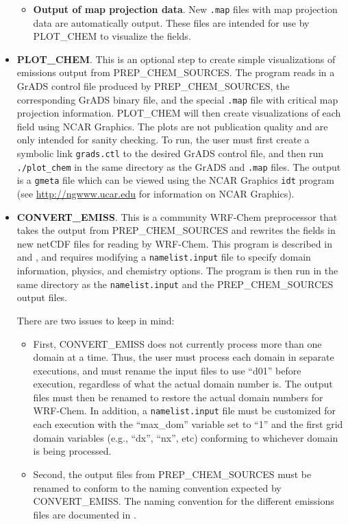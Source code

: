 \begin{itemize}
\begin{itemize}
\item \textbf{Output of map projection data}. New \texttt{.map} files with map
projection data are automatically output. These files are 
intended for use by PLOT\_CHEM to visualize the fields. 
\end{itemize}

\item \textbf{PLOT\_CHEM}. This is an optional step to create simple
visualizations of emissions output from PREP\_CHEM\_SOURCES. The program
reads in a GrADS control file produced by PREP\_CHEM\_SOURCES, the 
corresponding GrADS binary file, and the special \texttt{.map} file with 
critical map projection information. PLOT\_CHEM will then create 
visualizations of each field using NCAR Graphics. The plots are not 
publication quality and are only intended for sanity checking. To run, the 
user must first create a symbolic link \texttt{grads.ctl} to the desired 
GrADS control file, and then run \texttt{./plot\_chem} in the same directory 
as the GrADS and \texttt{.map} files. The output is a \texttt{gmeta} file 
which can be viewed using the NCAR Graphics \texttt{idt} program (see 
\url{http://ngwww.ucar.edu} for information on NCAR Graphics).

\item \textbf{CONVERT\_EMISS}. This is a community WRF-Chem preprocessor
that takes the output from PREP\_CHEM\_SOURCES and rewrites the fields in
new netCDF files for reading by WRF-Chem. This program is described in
\cite{ref:WrfChemUserGuide} and \cite{ref:WrfChemEmissionsGuide}, and requires
modifying a \texttt{namelist.input} file to specify domain information, 
physics, and chemistry options.  The program is then run in the same directory
as the \texttt{namelist.input} and the PREP\_CHEM\_SOURCES output files.

There are two issues to keep in mind:
\begin{itemize}
\item First, CONVERT\_EMISS does not currently process more than one domain at
  a time. Thus, the user must process each domain in separate executions, and 
  must rename the input files to use ``d01'' before execution, regardless of 
  what the actual domain number is. The output files must then be renamed to 
  restore the actual domain numbers for WRF-Chem. In addition, a 
  \texttt{namelist.input} file must be customized for each execution with the 
  ``max\_dom'' variable set to ``1'' and the first grid domain variables
  (e.g., ``dx'', ``nx'', etc) conforming to whichever domain is being 
  processed.
\item Second, the output files from PREP\_CHEM\_SOURCES must be renamed to
  conform to the naming convention expected by CONVERT\_EMISS. The naming
  convention for the different emissions files are documented in 
  \cite{ref:WrfChemEmissionsGuide}.
\end{itemize}


\end{itemize}
